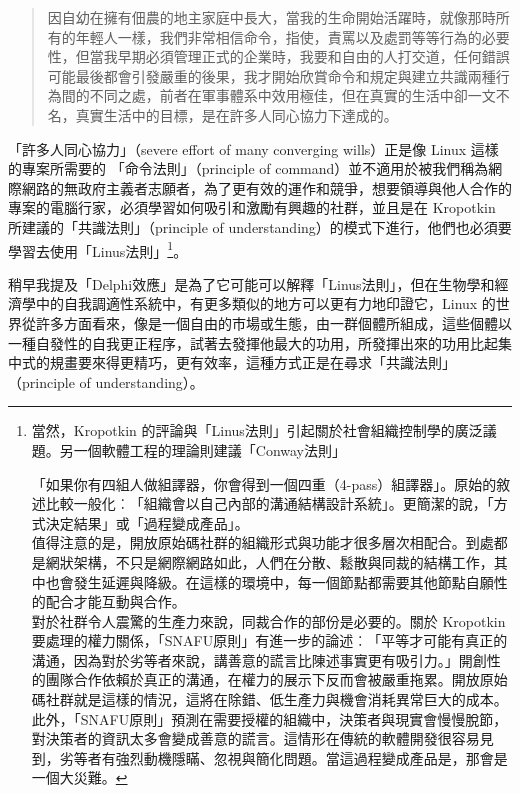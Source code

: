\documentclass[10pt, b5paper]{book}
\makeatletter
\newcommand*{\shifttext}[2]{%
  \settowidth{\@tempdima}{#2}%
  \makebox[\@tempdima]{\hspace*{#1}#2}%
}
\makeatother
\begin{document}
\begin{quote}
因自幼在擁有佃農的地主家庭中長大，當我的生命開始活躍時，就像那時所有的年輕人一樣，我們非常相信命令，指使，責罵以及處罰等等行為的必要性，但當我早期必須管理正式的企業時，我要和自由的人打交道，任何錯誤可能最後都會引發嚴重的後果，我才開始欣賞命令和規定與建立共識兩種行為間的不同之處，前者在軍事體系中效用極佳，但在真實的生活中卻一文不名，真實生活中的目標，是在許多人同心協力下達成的。
\end{quote}

「許多人同心協力」（severe effort of many converging wills）正是像 Linux
這樣的專案所需要的 \shifttext{1pt}{---}\shifttext{-1pt}{---} 「命令法則」（principle of
command）並不適用於被我們稱為網際網路的無政府主義者志願者，為了更有效的運作和競爭，想要領導與他人合作的專案的電腦行家，必須學習如何吸引和激勵有興趣的社群，並且是在
Kropotkin 所建議的「共識法則」（principle of
understanding）的模式下進行，他們也必須要學習去使用「Linus法則」\footnote{當然，Kropotkin
  的評論與「Linus法則」引起關於社會組織控制學的廣泛議題。另一個軟體工程的理論則建議「Conway法則」
  \shifttext{1pt}{---}\shifttext{-1pt}{---}
  「如果你有四組人做組譯器，你會得到一個四重（4-pass）組譯器」。原始的敘述比較一般化︰「組織會以自己內部的溝通結構設計系統」。更簡潔的說，「方式決定結果」或「過程變成產品」。\\值得注意的是，開放原始碼社群的組織形式與功能才很多層次相配合。到處都是網狀架構，不只是網際網路如此，人們在分散、鬆散與同裁的結構工作，其中也會發生延遲與降級。在這樣的環境中，每一個節點都需要其他節點自願性的配合才能互動與合作。\\對於社群令人震驚的生產力來說，同裁合作的部份是必要的。關於
  Kropotkin
  要處理的權力關係，「SNAFU原則」有進一步的論述︰「平等才可能有真正的溝通，因為對於劣等者來說，講善意的謊言比陳述事實更有吸引力。」開創性的團隊合作依賴於真正的溝通，在權力的展示下反而會被嚴重拖累。開放原始碼社群就是這樣的情況，這將在除錯、低生產力與機會消耗異常巨大的成本。\\此外，「SNAFU原則」預測在需要授權的組織中，決策者與現實會慢慢脫節，對決策者的資訊太多會變成善意的謊言。這情形在傳統的軟體開發很容易見到，劣等者有強烈動機隱瞞、忽視與簡化問題。當這過程變成產品是，那會是一個大災難。}。

稍早我提及「Delphi效應」是為了它可能可以解釋「Linus法則」，但在生物學和經濟學中的自我調適性系統中，有更多類似的地方可以更有力地印證它，Linux
的世界從許多方面看來，像是一個自由的市場或生態，由一群個體所組成，這些個體以一種自發性的自我更正程序，試著去發揮他最大的功用，所發揮出來的功用比起集中式的規畫要來得更精巧，更有效率，這種方式正是在尋求「共識法則」（principle
of understanding）。
\end{document}
